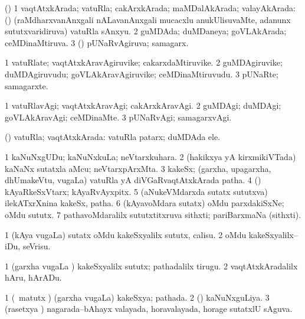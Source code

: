 \bentry
{}
\gl{\gu}
\bmng
(\aupa) 
\bnum
\num{1} vaqtAtxkArada; vatuRla; cakArxkArada; maMDalAkArada; valayAkArada:  (\veYshA) (raMdharxvanAnxgali nALavanAnxgali mucacxlu anukUlisuvaMte, adanunx sututxvaridiruva) vatuRla sAnxyu. 
\num{2} guMDAda; duMDaneya; goVLAkArada; ceMDinaMtiruva. 
\num{3} (\rUpa) pUNaRvAgiruva; samagarx. 
\enum
\emng
\eentry

\bentry
{}
\gl{\nA}
\bmng
\bnum
\num{1} vatuRlate; vaqtAtxkAravAgiruvike; cakarxdaMtiruvike. 
\num{2} guMDAgiruvike; duMDAgiruvudu; goVLAkAravAgiruvike; ceMDinaMtiruvudu. 
\num{3} pUNaRte; samagarxte. 
\enum
\emng
\eentry

\bentry
{}
\gl{\kirxvi}
\bmng
\bnum
\num{1} vatuRlavAgi; vaqtAtxkAravAgi; cakArxkAravAgi. 
\num{2} guMDAgi; duMDAgi; goVLAkAravAgi; ceMDinaMte. 
\num{3} pUNaRvAgi; samagarxvAgi. 
\enum
\emng
\eentry

\bentry
{}
\gl{\gu}
\bmng
(\savi) vatuRla; vaqtAtxkArada:  vatuRla patarx; duMDAda ele. 
\emng
\eentry

\bentry
{}
\gl{\nA}
\bmng
\bnum
\num{1} kaNuNxgUDu; kaNuNxkuLa; neVtarxkuhara. 
\num{2} (hakikxya yA kirxmikiVTada) kaNaNx sutatxla aMcu; neVtarxpArxMta. 
\num{3} kakeSx; (garxha, upagarxha, dhUmakeVtu, \mo vugaLa) vatuRla yA diVGaRvaqtAtxkArada patha. 
\num{4} (\rUpa) kAyaRkeSxVtarx; kAyaRvAyxpitx. 
\num{5} (aNukeVMdarxda sutatx sututxva) ilekATxrXnina kakeSx, patha. 
\num{6} (kAyavoMdara sutatx) oMdu parxdakiSxNe; oMdu sututx. 
\num{7} pathavoMdaralilx sututxtitxruva sithxti; pariBarxmaNa (sithxti). 
\enum
\emng
\eentry

\bentry
{}
\gl{\kirx}
\bmng
\emng

\noindent
\gl{\sakirx}
\bmng
\bnum
\num{1} (kAya \mo vugaLa) sutatx oMdu kakeSxyalilx sututx, calisu. 
\num{2} oMdu kakeSxyalilx--iDu, seVrisu. 
\enum
\emng

\noindent
\gl{\akirx}
\bmng
\bnum
\num{1} (garxha \mo vugaLa \vi) kakeSxyalilx sututx; pathadalilx tirugu. 
\num{2} vaqtAtxkAradalilx hAru, hArADu. 
\enum
\emng
\eentry

\bentry
{}
\gl{\gu}
\bmng
\bnum
\num{1} (\Kavi\ matutx \Bwvi) (garxha \mo vugaLa) kakeSxya; pathada. 
\num{2} (\aMrashA) kaNuNxguLiya. 
\num{3} (rasetxya \vi) nagarada--bAhayx valayada, horavalayada, horage sutatxlU sAguva. 
\enum
\emng
\eentry

